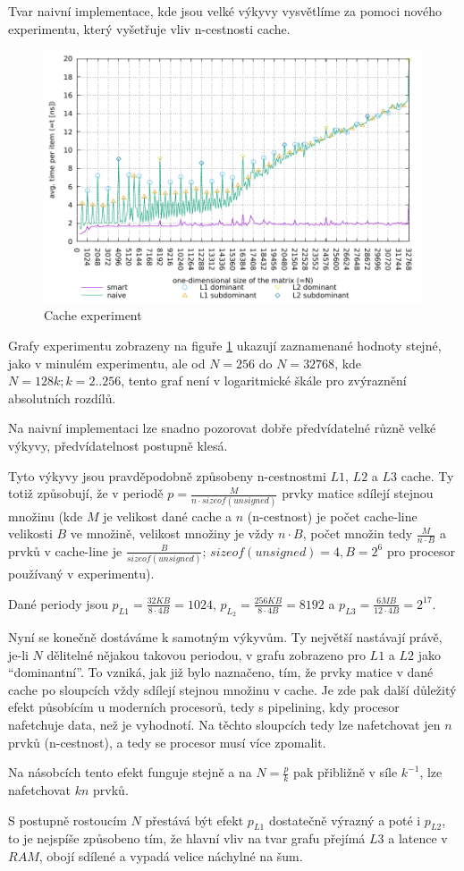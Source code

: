 \documentclass[a4paper,12pt]{article} %
\begin{document}
Tvar naivní implementace, kde jsou velké výkyvy vysvětlíme za pomoci nového experimentu, který vyšetřuje vliv n-cestnosti cache.

\begin{figure}[!hbt]
	\caption{Cache experiment}
	\label{real128graph}
	\includegraphics{real128.pdf}
\end{figure}

Grafy experimentu zobrazeny na figuře \ref{real128graph} ukazují zaznamenané hodnoty stejné, jako v minulém experimentu, ale od $N = 256$ do $N=32768$, kde $N=128k; k = 2..256$, tento graf není v logaritmické škále pro zvýraznění absolutních rozdílů.

Na naivní implementaci lze snadno pozorovat dobře předvídatelné různě velké výkyvy, předvídatelnost postupně klesá.

Tyto výkyvy jsou pravděpodobně způsobeny n-cestnostmi $L1$, $L2$ a $L3$ cache. Ty totiž způsobují, že v periodě $p = \frac{M}{n \cdot sizeof(unsigned)}$ prvky matice sdílejí stejnou množinu (kde $M$ je velikost dané cache a $n$ (n-cestnost) je počet cache-line velikosti $B$ ve množině, velikost množiny je vždy $n \cdot B$, počet množin tedy $\frac{M}{n \cdot B}$ a prvků v cache-line je $\frac{B}{sizeof(unsigned)}$; $sizeof(unsigned) = 4, B = 2^6$ pro procesor používaný v experimentu).

Dané periody jsou $p_{L1} = \frac{32KB}{8 \cdot 4B} = 1024$, $p_{L_2} = \frac{256KB}{8 \cdot 4B} = 8192$ a $p_{L3} = \frac{6MB}{12 \cdot 4B} = 2^{17}$.

Nyní se konečně dostáváme k samotným výkyvům. Ty největší nastávají právě, je-li $N$ dělitelné nějakou takovou periodou, v grafu zobrazeno pro $L1$ a $L2$ jako ``dominantní''. To vzniká, jak již bylo naznačeno, tím, že prvky matice v dané cache po sloupcích vždy sdílejí stejnou množinu v cache. Je zde pak další důležitý efekt působícím u moderních procesorů, tedy s pipelining, kdy procesor nafetchuje data, než je vyhodnotí. Na těchto sloupcích tedy lze nafetchovat jen $n$ prvků (n-cestnost), a tedy se procesor musí více zpomalit.

Na násobcích tento efekt funguje stejně a na $N = \frac{p}{k}$ pak přibližně v síle $k^{-1}$, lze nafetchovat $kn$ prvků.

S postupně rostoucím $N$ přestává být efekt $p_{L1}$ dostatečně výrazný a poté i $p_{L2}$, to je nejspíše způsobeno tím, že hlavní vliv na tvar grafu přejímá $L3$ a latence v $RAM$, obojí sdílené a vypadá velice náchylné na šum.
\end{document}
